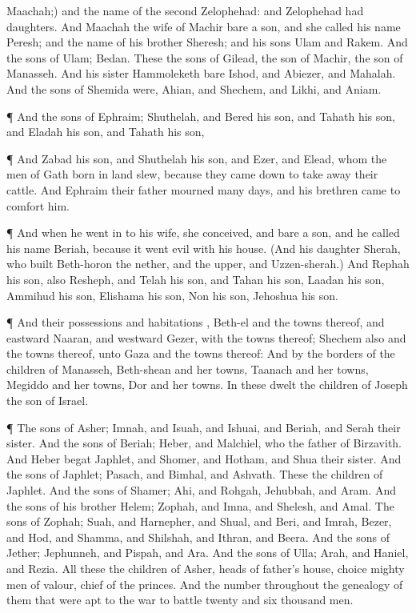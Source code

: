 {Maachah;) and the
name of the
second
{}
Zelophehad: and
Zelophehad had
daughters.
And
Maachah the
wife of
Machir
bare a
son, and she
called his
name
Peresh; and the
name of his
brother
{}
Sheresh; and his
sons
{}
Ulam and
Rakem.
And the
sons of
Ulam;
Bedan. These
{} the
sons of
Gilead, the
son of
Machir, the
son of
Manasseh.
And his
sister
Hammoleketh
bare
Ishod, and
Abiezer, and
Mahalah.
And the
sons of
Shemida were,
Ahian, and
Shechem, and
Likhi, and
Aniam.
\par }{\PP {}¶ And the
sons of
Ephraim;
Shuthelah, and
Bered his
son, and
Tahath his
son, and
Eladah his
son, and
Tahath his
son,
\par }{\PP {}¶ And
Zabad his
son, and
Shuthelah his
son, and
Ezer, and
Elead, whom the
men of
Gath
{}
born in
{}
land
slew, because they came
down to take
away their
cattle.
And
Ephraim their
father
mourned
many
days, and his
brethren
came to
comfort him.
\par }{\PP {}¶ And when he went
in to his
wife, she
conceived, and
bare a
son, and he
called his
name
Beriah, because it went
evil with his
house.
(And his
daughter
{}
Sherah, who
built
Beth-horon the
nether, and the
upper, and
Uzzen-sherah.)
And
Rephah
{} his
son, also
Resheph, and
Telah his
son, and
Tahan his
son,
Laadan his
son,
Ammihud his
son,
Elishama his
son,
Non his
son,
Jehoshua his
son.
\par }{\PP {}¶ And their
possessions and
habitations
{},
Beth-el and the
towns thereof, and
eastward
Naaran, and
westward
Gezer, with the
towns thereof;
Shechem also and the
towns thereof, unto
Gaza and the
towns thereof:
And by the
borders of the
children of
Manasseh,
Beth-shean and her
towns,
Taanach and her
towns,
Megiddo and her
towns,
Dor and her
towns. In these
dwelt the
children of
Joseph the
son of
Israel.
\par }{\PP {}¶ The
sons of
Asher;
Imnah, and
Isuah, and
Ishuai, and
Beriah, and
Serah their
sister.
And the
sons of
Beriah;
Heber, and
Malchiel, who
{} the
father of
Birzavith.
And
Heber
begat
Japhlet, and
Shomer, and
Hotham, and
Shua their
sister.
And the
sons of
Japhlet;
Pasach, and
Bimhal, and
Ashvath. These
{} the
children of
Japhlet.
And the
sons of
Shamer;
Ahi, and
Rohgah,
Jehubbah, and
Aram.
And the
sons of his
brother
Helem;
Zophah, and
Imna, and
Shelesh, and
Amal.
The
sons of
Zophah;
Suah, and
Harnepher, and
Shual, and
Beri, and
Imrah,
Bezer, and
Hod, and
Shamma, and
Shilshah, and
Ithran, and
Beera.
And the
sons of
Jether;
Jephunneh, and
Pispah, and
Ara.
And the
sons of
Ulla;
Arah, and
Haniel, and
Rezia.
All these
{} the
children of
Asher,
heads of
{}
father’s
house,
choice
{} mighty
men of
valour,
chief of the
princes. And the
number throughout the
genealogy of them that were apt to the
war
{} to
battle
{}
twenty and
six
thousand
men.

}
